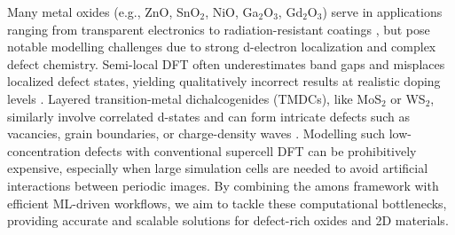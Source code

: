 \documentclass[11pt,english,calcwidth,compact]{nserc-appendix}
\begin{document}
Many metal oxides (e.g., ZnO, SnO$_2$, NiO, Ga$_2$O$_3$, Gd$_2$O$_3$)  serve in applications ranging from transparent electronics to radiation-resistant coatings \cite{transparentcoat,nucshield}, but pose notable modelling challenges due to strong d-electron localization and complex defect chemistry. Semi-local DFT often underestimates band gaps and misplaces localized defect states, yielding qualitatively incorrect results at realistic doping levels \cite{localized2011defect}. Layered transition-metal dichalcogenides (TMDCs), like MoS$_2$ or WS$_2$, similarly involve correlated d-states and can form intricate defects such as vacancies, grain boundaries, or charge-density waves \cite{kim2022experimental}. Modelling such low-concentration defects with conventional supercell DFT can be prohibitively expensive, especially when large simulation cells are needed to avoid artificial interactions between periodic images. By combining the amons framework with efficient ML-driven workflows, we aim to tackle these computational bottlenecks, providing accurate and scalable solutions for defect-rich oxides and 2D materials.
%
%
\end{document}
